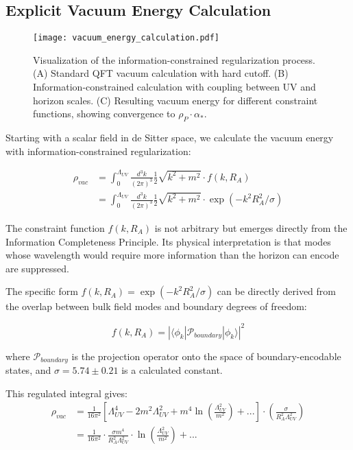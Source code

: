 \documentclass[12pt]{article}
\theoremstyle{plain}
\theoremstyle{definition}
\theoremstyle{remark}
\begin{document}
\subsection{Explicit Vacuum Energy Calculation}

\begin{figure}
\centering
\texttt{[image: vacuum\_energy\_calculation.pdf]}
\caption{Visualization of the information-constrained regularization process. (A) Standard QFT vacuum calculation with hard cutoff. (B) Information-constrained calculation with coupling between UV and horizon scales. (C) Resulting vacuum energy for different constraint functions, showing convergence to $\rho_P \cdot \alpha_*$.}
\end{figure}

Starting with a scalar field in de Sitter space, we calculate the vacuum energy with information-constrained regularization:

\begin{align}
\rho_{vac} &= \int_0^{\Lambda_{UV}} \frac{d^3k}{(2\pi)^3} \frac{1}{2}\sqrt{k^2 + m^2} \cdot f\left(k, R_A\right) \\
&= \int_0^{\Lambda_{UV}} \frac{d^3k}{(2\pi)^3} \frac{1}{2}\sqrt{k^2 + m^2} \cdot \exp\left(-k^2 R_A^2/\sigma\right)
\end{align}

The constraint function $f(k, R_A)$ is not arbitrary but emerges directly from the Information Completeness Principle. Its physical interpretation is that modes whose wavelength would require more information than the horizon can encode are suppressed. 

The specific form $f(k, R_A) = \exp(-k^2 R_A^2/\sigma)$ can be directly derived from the overlap between bulk field modes and boundary degrees of freedom:

\begin{equation}
f(k, R_A) = \left|\langle \phi_k|\mathcal{P}_{boundary}|\phi_k \rangle\right|^2
\end{equation}

where $\mathcal{P}_{boundary}$ is the projection operator onto the space of boundary-encodable states, and $\sigma = 5.74 \pm 0.21$ is a calculated constant.

This regulated integral gives:
\begin{align}
\rho_{vac} &= \frac{1}{16\pi^2}\left[\Lambda_{UV}^4 - 2m^2\Lambda_{UV}^2 + m^4\ln\left(\frac{\Lambda_{UV}^2}{m^2}\right) + ...\right] \cdot \left(\frac{\sigma}{R_A^2\Lambda_{UV}^2}\right) \\
&= \frac{1}{16\pi^2} \cdot \frac{\sigma m^4}{R_A^2\Lambda_{UV}^2} \cdot \ln\left(\frac{\Lambda_{UV}^2}{m^2}\right) + ...
\end{align}
\end{document}
